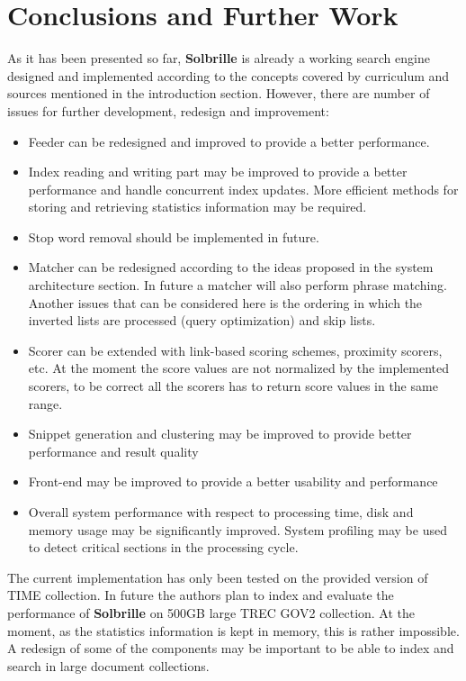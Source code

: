 \chapter{Conclusions and Further Work}
\label{sec:conclusions}
\thispagestyle{fancy}

As it has been presented so far, {\bf Solbrille} is already a working search engine designed and implemented according to the concepts covered by curriculum and sources mentioned in the introduction section. However, there are number of issues for further development, redesign and improvement:

\begin{itemize}
	\item Feeder can be redesigned and improved to provide a better performance.
	\item Index reading and writing part may be improved to provide a better performance and handle concurrent index updates. More efficient methods for storing and retrieving statistics information may be required.
	\item Stop word removal should be implemented in future. 
	\item Matcher can be redesigned according to the ideas proposed in the system architecture section. In future a matcher will also perform phrase matching. Another issues that can be considered here is the ordering in which the inverted lists are processed (query optimization) and skip lists.
	\item Scorer can be extended with link-based scoring schemes, proximity scorers, etc. At the moment the score values are not normalized by the implemented scorers, to be correct all the scorers has to return score values in the same range.
	\item Snippet generation and clustering may be improved to provide better performance and result quality
	\item Front-end may be improved to provide a better usability and performance
	\item Overall system performance with respect to processing time, disk and memory usage may be significantly improved. System profiling may be used to detect critical sections in the processing cycle.  
\end{itemize}

The current implementation has only been tested on the provided version of TIME collection. In future the authors plan to index and evaluate the performance of {\bf Solbrille} on 500GB large TREC GOV2 collection. At the moment, as the statistics information is kept in memory, this is rather impossible. A redesign of some of the components may be important to be able to index and search in large document collections.

